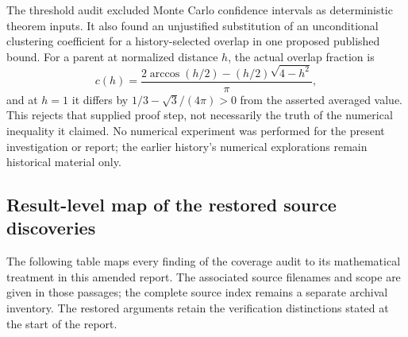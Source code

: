 \documentclass[11pt,a4paper]{article}
\theoremstyle{definition}
\theoremstyle{remark}
\numberwithin{equation}{section}
\begin{document}
The threshold audit excluded Monte Carlo confidence intervals as
deterministic theorem inputs.  It also found an unjustified substitution
of an unconditional clustering coefficient for a history-selected
overlap in one proposed published bound.  For a parent at normalized
distance $h$, the actual overlap fraction is
\[
 c(h)=\frac{2\arccos(h/2)-(h/2)\sqrt{4-h^2}}{\pi},
\]
and at $h=1$ it differs by
$1/3-\sqrt3/(4\pi)>0$ from the asserted averaged value.
This rejects that supplied proof step, not necessarily the truth of
the numerical inequality it claimed.  No numerical experiment was
performed for the present investigation or report; the earlier
history's numerical explorations remain historical material only.

\subsection{Result-level map of the restored source discoveries}
\label{br:coverage-map}

The following table maps every finding of the coverage audit to its
mathematical treatment in this amended report. The associated source
filenames and scope are given in those passages; the complete source
index remains a separate archival inventory. The restored arguments
retain the verification distinctions stated at the start of the report.
\end{document}
